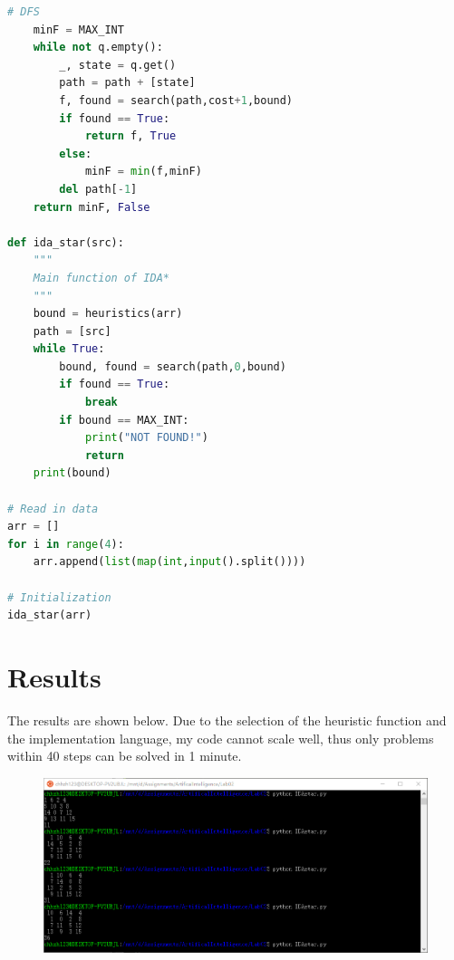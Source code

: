 \documentclass[a4paper, 11pt]{article}
\begin{document}
\begin{lstlisting}[language=Python]
	# DFS
	minF = MAX_INT
	while not q.empty():
		_, state = q.get()
		path = path + [state]
		f, found = search(path,cost+1,bound)
		if found == True:
			return f, True
		else:
			minF = min(f,minF)
		del path[-1]
	return minF, False

def ida_star(src):
	"""
	Main function of IDA*
	"""
	bound = heuristics(arr)
	path = [src]
	while True:
		bound, found = search(path,0,bound)
		if found == True:
			break
		if bound == MAX_INT:
			print("NOT FOUND!")
			return
	print(bound)

# Read in data
arr = []
for i in range(4):
	arr.append(list(map(int,input().split())))

# Initialization
ida_star(arr)
\end{lstlisting}



\section{Results}
The results are shown below.
Due to the selection of the heuristic function and the implementation language, my code cannot scale well, thus only problems within 40 steps can be solved in 1 minute.
\begin{figure}[H]
\centering
\includegraphics[width=\linewidth]{fig/python.png}
\end{figure}


%
%
\end{document}
